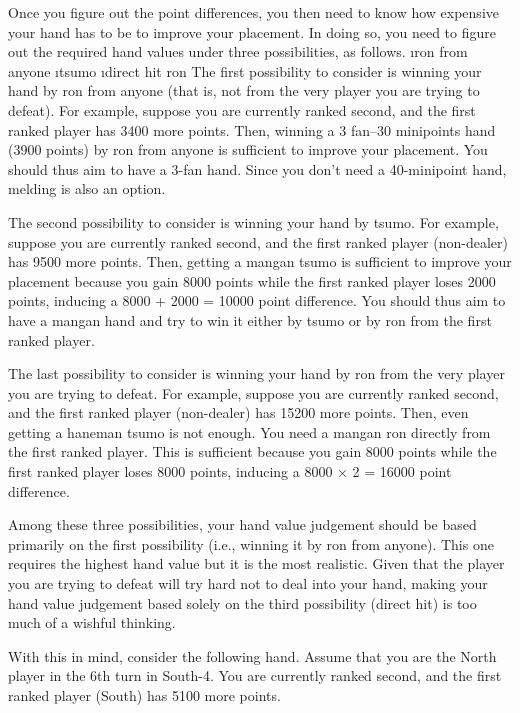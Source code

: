 \bigskip
Once you figure out the point differences, you then need to know how expensive your hand has to be to improve your placement. In doing so, you need to figure out the required hand values under three possibilities, as follows.
\be
\i {\jap ron} from anyone
\i {\jap tsumo}
\i direct hit {\jap ron}
\ee
The first possibility to consider is winning your hand by {\jap ron} from anyone (that is, not from the very player you are trying to defeat). For example, suppose you are currently ranked second, and the first ranked player has 3400 more points. Then, winning a 3 {\jap fan}--30 minipoints hand (3900 points) by {\jap ron} from anyone is sufficient to improve your placement. You should thus aim to have a 3-{\jap fan} hand. Since you don't need a 40-minipoint hand, melding is also an option. 

\bigskip
The second possibility to consider is winning your hand by {\jap tsumo}. For example, suppose you are currently ranked second, and the first ranked player (non-dealer) has 9500 more points. Then, getting a {\jap mangan tsumo} is sufficient to improve your placement because you gain 8000 points while the first ranked player loses 2000 points, inducing a 8000 + 2000 = 10000 point difference. You should thus aim to have a {\jap mangan} hand and try to win it either by {\jap tsumo} or by {\jap ron} from the first ranked player. 

\bigskip
The last possibility to consider is winning your hand by {\jap ron} from the very player you are trying to defeat. For example, suppose you are currently ranked second, and the first ranked player (non-dealer) has 15200 more points. Then, even getting a {\jap haneman tsumo} is not enough. You need a {\jap mangan ron} directly from the first ranked player. This is sufficient because you gain 8000 points while the first ranked player loses 8000 points, inducing a 8000 $\times$ 2 = 16000 point difference. 

\bigskip
Among these three possibilities, your hand value judgement should be based primarily on the first possibility (i.e., winning it by {\jap ron} from anyone). This one requires the highest hand value but it is the most realistic. Given that the player you are trying to defeat will try hard not to deal into your hand, making your hand value judgement based solely on the third possibility (direct hit) is too much of a wishful thinking. 

\bigskip
With this in mind, consider the following hand. Assume that you are the North player in the 6th turn in South-4. You are currently ranked second, and the first ranked player (South) has 5100 more points. 

